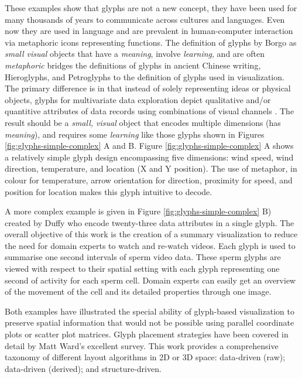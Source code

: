 These examples show that glyphs are not a new concept, they have been used for many thousands of years to communicate across cultures and languages.
Even now they are used in language and are prevalent in human-computer interaction via metaphoric icons representing functions. 
The definition of glyphs by Borgo \etal \cite{Borgo:2013:EG} as \emph{small visual} objects that have a \emph{meaning}, involve \emph{learning}, and are often \emph{metaphoric} bridges the definitions of glyphs in ancient Chinese writing, Hieroglyphs, and Petroglyphs to the definition of glyphs used in visualization.
The primary difference is in that instead of solely representing ideas or physical objects, glyphs for multivariate data exploration depict qualitative and/or quantitive attributes of data records using combinations of visual channels \cite{Borgo:2013:EG}.
The result should be a \emph{small, visual} object that encodes multiple dimensions (has \emph{meaning}), and requires some \emph{learning} like those glyphs shown in Figures \ref{fig:glyphs-simple-complex} A and B.
Figure \ref{fig:glyphs-simple-complex} A shows a relatively simple glyph design encompassing five dimensions: wind speed, wind direction, temperature, and location (X and Y position).
The use of metaphor, in colour for temperature, arrow orientation for direction, proximity for speed, and position for location makes this glyph intuitive to decode. 

A more complex example is given in Figure \ref{fig:glyphs-simple-complex} B) created by Duffy \etal \cite{Duffy:2014:TVCG} who encode twenty-three data attributes in a single glyph.
The overall objective of this work is the creation of a summary visualization to reduce the need for domain experts to watch and re-watch videos.
Each glyph is used to summarise one second intervals of sperm video data.
These sperm glyphs are viewed with respect to their spatial setting with each glyph representing one second of activity for each sperm cell.
Domain experts can easily get an overview of the movement of the cell and its detailed properties through one image.

Both examples have illustrated the special ability of glyph-based visualization to preserve spatial information that would not be possible using parallel coordinate plots or scatter plot matrices.
Glyph placement strategies have been covered in detail by Matt Ward's \cite{ward02} excellent survey.
This work provides a comprehensive taxonomy of different layout algorithms in 2D or 3D space: data-driven (raw); data-driven (derived); and structure-driven.

